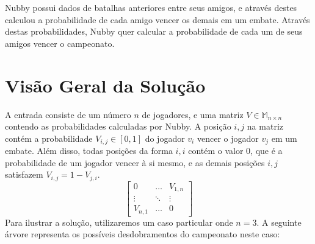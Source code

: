 \documentclass{article}
\begin{document}
Nubby possui dados de batalhas anteriores entre seus amigos, e através destes calculou a probabilidade de cada amigo vencer os demais em um embate. Através destas probabilidades, Nubby quer calcular a probabilidade de cada um de seus amigos vencer o campeonato.


\section{Visão Geral da Solução}
A entrada consiste de um número $n$ de jogadores, e uma matriz $V \in \mathbb{M}_{n \times n}$ contendo as probabilidades calculadas por Nubby. A posição $i, j$ na matriz contém a probabilidade $V_{i,j} \in [0,1]$ do jogador $v_i$ vencer o jogador $v_j$ em um embate. Além disso, todas posições da forma $i, i$ contém o valor $0$, que é a probabilidade de um jogador vencer à si mesmo, e as demais posições $i, j$ satisfazem $V_{i,j} = 1 - V_{j,i}$.
\[
  \begin{bmatrix}
      0 & \hdots  & V_{1,n} \\
      \vdots & \ddots  & \vdots \\
      V_{n,1} & \hdots & 0
  \end{bmatrix}
\]
Para ilustrar a solução, utilizaremos um caso particular onde $n = 3$. A seguinte árvore representa os possíveis desdobramentos do campeonato neste caso:
\end{document}
